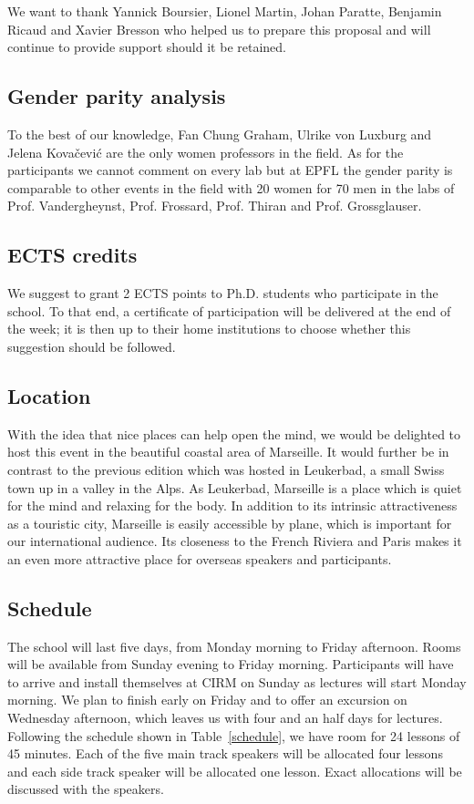 \documentclass[a4paper]{scrartcl}
\begin{document}
We want to thank Yannick Boursier, Lionel Martin, Johan Paratte, Benjamin Ricaud
and Xavier Bresson who helped us to prepare this proposal and will continue to
provide support should it be retained.

\subsection{Gender parity analysis}

To the best of our knowledge, Fan Chung Graham, Ulrike von Luxburg and Jelena
Kovačević are the only women professors in the field. As for the participants we
cannot comment on every lab but at EPFL the gender parity is comparable to other
events in the field with 20 women for 70 men in the labs of Prof. Vandergheynst,
Prof. Frossard, Prof. Thiran and Prof. Grossglauser.

\subsection{ECTS credits}

We suggest to grant 2 ECTS points to Ph.D. students who participate in the
school. To that end, a certificate of participation will be delivered at the end
of the week; it is then up to their home institutions to choose whether this
suggestion should be followed.

\subsection{Location}

With the idea that nice places can help open the mind, we would be delighted to
host this event in the beautiful coastal area of Marseille. It would further be
in contrast to the previous edition which was hosted in Leukerbad, a small Swiss
town up in a valley in the Alps. As Leukerbad, Marseille is a place which is
quiet for the mind and relaxing for the body. 
In addition to its intrinsic attractiveness as a touristic city, Marseille is
easily accessible by plane, which is important for our international audience.
Its closeness to the French Riviera and Paris makes it an even more attractive
place for overseas speakers and participants.

\subsection{Schedule}

The school will last five days, from Monday morning to Friday afternoon. Rooms
will be available from Sunday evening to Friday morning. Participants will have
to arrive and install themselves at CIRM on Sunday as lectures will start Monday
morning. We plan to finish early on Friday and to offer an excursion on
Wednesday afternoon, which leaves us with four and an half days for lectures.
Following the schedule shown in Table~\ref{schedule}, we have room for 24
lessons of 45 minutes. Each of the five main track speakers will be allocated
four lessons and each side track speaker will be allocated one lesson.
Exact allocations will be discussed with the speakers.
\end{document}
